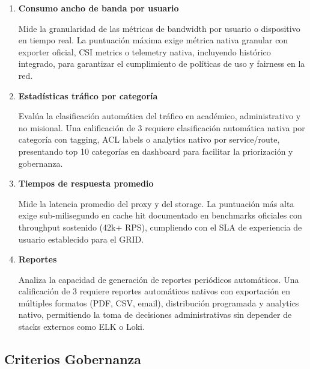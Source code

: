 \begin{enumerate}[resume*=criterios]
  \item \textbf{Consumo ancho de banda por usuario}

  Mide la granularidad de las métricas de bandwidth por usuario o dispositivo en tiempo real. La puntuación máxima exige métrica nativa granular con exporter oficial, CSI metrics o telemetry nativa, incluyendo histórico integrado, para garantizar el cumplimiento de políticas de uso y fairness en la red.

  \item \textbf{Estadísticas tráfico por categoría}

  Evalúa la clasificación automática del tráfico en académico, administrativo y no misional. Una calificación de 3 requiere clasificación automática nativa por categoría con tagging, ACL labels o analytics nativo por service/route, presentando top 10 categorías en dashboard para facilitar la priorización y gobernanza.

  \item \textbf{Tiempos de respuesta promedio}

  Mide la latencia promedio del proxy y del storage. La puntuación más alta exige sub-milisegundo en cache hit documentado en benchmarks oficiales con throughput sostenido (42k+ RPS), cumpliendo con el SLA de experiencia de usuario establecido para el GRID.

  \item \textbf{Reportes}

  Analiza la capacidad de generación de reportes periódicos automáticos. Una calificación de 3 requiere reportes automáticos nativos con exportación en múltiples formatos (PDF, CSV, email), distribución programada y analytics nativo, permitiendo la toma de decisiones administrativas sin depender de stacks externos como ELK o Loki.

\end{enumerate}

\subsection{Criterios Gobernanza}

